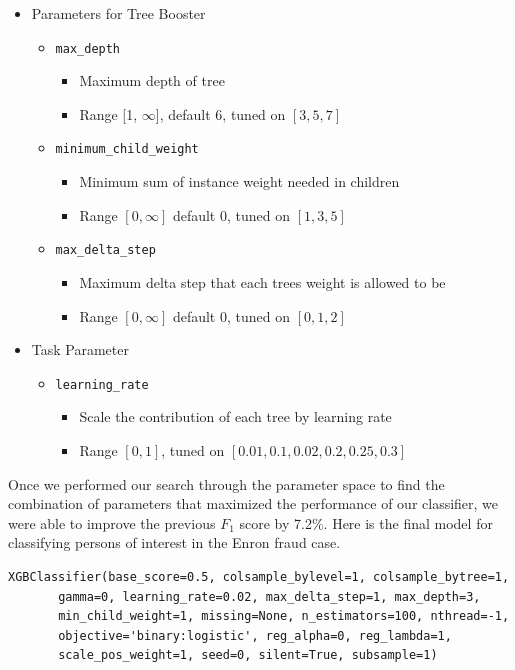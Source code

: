 \documentclass[twoside,openright,titlepage,numbers=noenddot,headinclude,%
               footinclude=true,cleardoublepage=empty,abstractoff,BCOR=5mm,%
               paper=a4,fontsize=11pt,ngerman,american]{scrreprt}
\numberwithin{theorem}{chapter}
\numberwithin{definition}{chapter}
\numberwithin{algorithm}{chapter}
\numberwithin{figure}{chapter}
\numberwithin{table}{chapter}
\numberwithin{equation}{chapter}
\begin{document}
\begin{itemize}
\item Parameters for Tree Booster
    \begin{itemize}
        \item \texttt{max\_depth}
        \begin{itemize}
            \item Maximum depth of tree
            \item Range [1, $\infty$], default 6, tuned on $[3,5,7]$
        \end{itemize}
        \item \texttt{minimum\_child\_weight}
        \begin{itemize}
            \item Minimum sum of instance weight needed in children
            \item Range $[0,\infty]$ default 0, tuned on $[1,3,5]$
        \end{itemize}
        \item \texttt{max\_delta\_step}
        \begin{itemize}
            \item Maximum delta step that each trees weight is allowed to be
            \item Range $[0, \infty]$ default 0, tuned on $[0, 1, 2]$
        \end{itemize}
    \end{itemize}

\item Task Parameter
    \begin{itemize}
        \item \texttt{learning\_rate}
        \begin{itemize}
            \item Scale the contribution of each tree by learning rate
            \item Range $[0, 1]$, tuned on $[0.01, 0.1, 0.02, 0.2, 0.25, 0.3]$
        \end{itemize}
    \end{itemize} 
\end{itemize}

Once we performed our search through the parameter space to find the combination of parameters that maximized the performance of our classifier, we were able to improve the previous $F_1$ score by 7.2\%. Here is the final model for classifying persons of interest in the Enron fraud case.
\begin{verbatim}
XGBClassifier(base_score=0.5, colsample_bylevel=1, colsample_bytree=1,
       gamma=0, learning_rate=0.02, max_delta_step=1, max_depth=3,
       min_child_weight=1, missing=None, n_estimators=100, nthread=-1,
       objective='binary:logistic', reg_alpha=0, reg_lambda=1,
       scale_pos_weight=1, seed=0, silent=True, subsample=1)
\end{verbatim}
\end{document}
